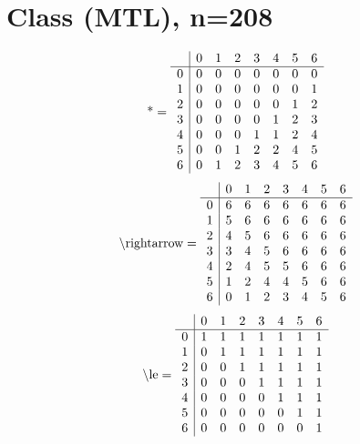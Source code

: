\documentclass[11pt]{article}
\begin{document}
\section{Class (MTL), n=208}
\[\text{*} = 
\begin{array}{r | r r r r r r r}
 & 0 & 1 & 2 & 3 & 4 & 5 & 6 \\ \hline
0 & 0 & 0 & 0 & 0 & 0 & 0 & 0 \\
1 & 0 & 0 & 0 & 0 & 0 & 0 & 1 \\
2 & 0 & 0 & 0 & 0 & 0 & 1 & 2 \\
3 & 0 & 0 & 0 & 0 & 1 & 2 & 3 \\
4 & 0 & 0 & 0 & 1 & 1 & 2 & 4 \\
5 & 0 & 0 & 1 & 2 & 2 & 4 & 5 \\
6 & 0 & 1 & 2 & 3 & 4 & 5 & 6 \\
\end{array}
\]
\[\text{\textbackslash rightarrow} = 
\begin{array}{r | r r r r r r r}
 & 0 & 1 & 2 & 3 & 4 & 5 & 6 \\ \hline
0 & 6 & 6 & 6 & 6 & 6 & 6 & 6 \\
1 & 5 & 6 & 6 & 6 & 6 & 6 & 6 \\
2 & 4 & 5 & 6 & 6 & 6 & 6 & 6 \\
3 & 3 & 4 & 5 & 6 & 6 & 6 & 6 \\
4 & 2 & 4 & 5 & 5 & 6 & 6 & 6 \\
5 & 1 & 2 & 4 & 4 & 5 & 6 & 6 \\
6 & 0 & 1 & 2 & 3 & 4 & 5 & 6 \\
\end{array}
\]
\[\text{\textbackslash le} = 
\begin{array}{r | r r r r r r r}
 & 0 & 1 & 2 & 3 & 4 & 5 & 6 \\ \hline
0 & 1 & 1 & 1 & 1 & 1 & 1 & 1 \\
1 & 0 & 1 & 1 & 1 & 1 & 1 & 1 \\
2 & 0 & 0 & 1 & 1 & 1 & 1 & 1 \\
3 & 0 & 0 & 0 & 1 & 1 & 1 & 1 \\
4 & 0 & 0 & 0 & 0 & 1 & 1 & 1 \\
5 & 0 & 0 & 0 & 0 & 0 & 1 & 1 \\
6 & 0 & 0 & 0 & 0 & 0 & 0 & 1 \\
\end{array}
\]
\end{document}
